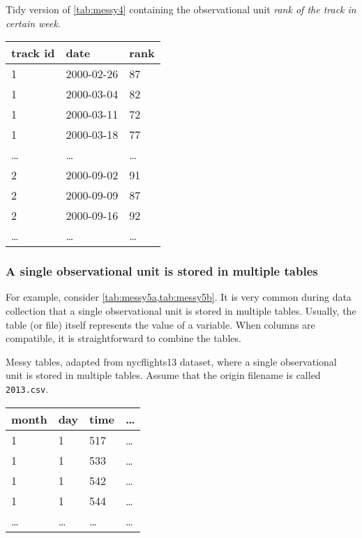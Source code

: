 \begin{tablebox}[label=tab:tidy4b]{Tidy version of \cref{tab:messy4} containing the observational unit \emph{rank of the track in certain week}.}
  \centering
  \begin{tabular}{lll}
    \toprule
    track id & date & rank \\
    \midrule
    1 & 2000-02-26 & 87 \\
    1 & 2000-03-04 & 82 \\
    1 & 2000-03-11 & 72 \\
    1 & 2000-03-18 & 77 \\
    \dots & \dots & \dots \\
    2 & 2000-09-02 & 91 \\
    2 & 2000-09-09 & 87 \\
    2 & 2000-09-16 & 92 \\
    \dots & \dots & \dots \\
    \bottomrule
  \end{tabular}
\end{tablebox}

\subsubsection{A single observational unit is stored in multiple tables}  For example, consider
\cref{tab:messy5a,tab:messy5b}.  It is very common during data
collection that a single observational unit is stored in multiple tables.  Usually, the
table (or file) itself represents the value of a variable.  When columns are compatible,
it is straightforward to combine the tables.

\begin{tablebox}[label=tab:messy5a]{Messy tables, adapted from nycflights13 dataset, where
  a single observational unit is stored in multiple tables.  Assume that the origin
  filename is called \texttt{2013.csv}.}
  \centering
  \begin{tabular}{llll}
    \toprule
    month & day & time & \dots \\
    \midrule
    1 & 1 & 517 & \dots \\
    1 & 1 & 533 & \dots \\
    1 & 1 & 542 & \dots \\
    1 & 1 & 544 & \dots \\
    \dots & \dots & \dots & \dots \\
    \bottomrule
  \end{tabular}
\end{tablebox}

